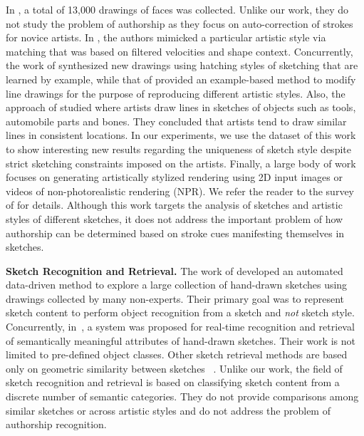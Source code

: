 In \cite{Limpaecher:2013:RDA:2461912.2462016}, a total of 13,000 drawings of faces was collected. Unlike our work, they do not study the problem of authorship as they focus on auto-correction of strokes for novice artists. In \cite{Lu:2012:HES}, the authors mimicked a particular artistic style via matching that was based on filtered velocities and shape context. Concurrently, the work of \cite{Kalogerakis:2012:mlhatching} synthesized new drawings using hatching styles of sketching that are learned by example, while that of  provided an example-based method to modify line drawings for the purpose of reproducing different artistic styles. Also, the approach of  studied where artists draw lines in sketches of objects such as tools, automobile parts and bones. They concluded that artists tend to draw similar lines in consistent locations. In our experiments, we use the dataset of this work to show interesting new results regarding the uniqueness of sketch style despite strict sketching constraints imposed on the artists. Finally, a large body of work focuses on generating artistically stylized rendering using 2D input images or videos of non-photorealistic rendering (NPR). We refer the reader to the survey of \cite{Kyprianidis:2013:TAS} for details. Although this work targets the analysis of sketches and artistic styles of different sketches, it does not address the important problem of how authorship can be determined based on stroke cues manifesting themselves in sketches. %


\noindent\textbf{Sketch Recognition and Retrieval.}
The work of  developed an automated data-driven method to explore a large collection of hand-drawn sketches using drawings collected by many non-experts. Their primary goal was to represent sketch content to perform object recognition from a sketch and \emph{not} sketch style. Concurrently, in~\cite{Sun:2012:SAH:2393347.2396429}, a system was proposed for real-time recognition and retrieval of semantically meaningful attributes of hand-drawn sketches. Their work is not limited to pre-defined object classes. Other sketch retrieval methods are based only on geometric similarity between sketches ~\cite{Shrivastava:2011:DVS:2024156.2024188,5674030}. Unlike our work, the field of sketch recognition and retrieval is based on classifying sketch content from a discrete number of semantic categories. They do not provide comparisons among similar sketches or across artistic styles and do not address the problem of authorship recognition.

